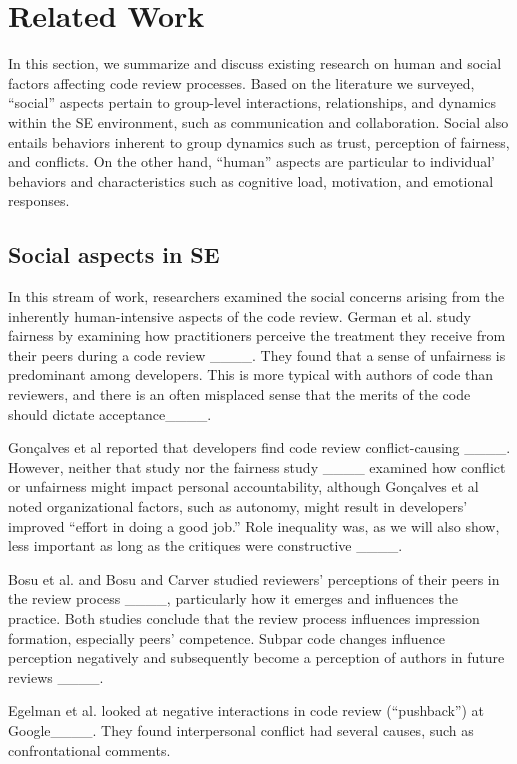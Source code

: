 \section{Related Work}
\label{sec:related}

In this section, we summarize and discuss existing research on human and social factors affecting code review processes. Based on the literature we surveyed, ``social'' aspects pertain to group-level interactions, relationships, and dynamics within the SE environment, such as communication and collaboration. Social also entails behaviors inherent to group dynamics such as trust, perception of fairness, and conflicts. On the other hand, ``human'' aspects are particular to individual' behaviors and characteristics such as cognitive load, motivation, and emotional responses.

\subsection{Social aspects in SE}

In this stream of work, researchers examined the social concerns arising from the inherently human-intensive aspects of the code review. German et al. study fairness by examining how practitioners perceive the treatment they receive from their peers during a code review ____. They found that a sense of unfairness is predominant among developers. This is more typical with authors of code than reviewers, and there is an often misplaced sense that the merits of the code should dictate acceptance____.

Gon\c{c}alves et al reported that developers find code review conflict-causing ____. However, neither that study nor the fairness study ____ examined how conflict or unfairness might impact personal accountability, although Gon\c{c}alves et al noted organizational factors, such as autonomy, might result in developers' improved ``effort in doing a good job.'' Role inequality was, as we will also show, less important as long as the critiques were constructive ____. 

Bosu et al. and Bosu and Carver studied reviewers' perceptions of their peers in the review process ____, particularly how it emerges and influences the practice. Both studies conclude that the review process influences impression formation, especially peers' competence. Subpar code changes influence perception negatively and subsequently become a perception of authors in future reviews ____.

Egelman et al. looked at negative interactions in code review (``pushback'') at Google____. They found interpersonal conflict had several causes, such as confrontational comments. 

